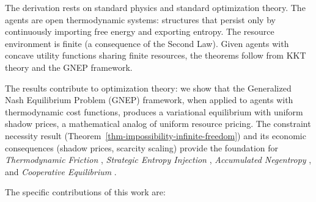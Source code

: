 \documentclass[11pt]{article}
\theoremstyle{plain}
\theoremstyle{definition}
\theoremstyle{remark}
\begin{document}
The derivation rests on standard physics and standard optimization
theory. The agents are open thermodynamic systems: structures that
persist only by continuously importing free energy and exporting
entropy. The resource environment is finite (a consequence of the Second
Law). Given agents with concave utility functions sharing finite
resources, the theorems follow from KKT theory and the GNEP framework.

The results contribute to optimization theory: we show that the
Generalized Nash Equilibrium Problem (GNEP) framework, when applied to
agents with thermodynamic cost functions, produces a variational
equilibrium with uniform shadow prices, a mathematical analog of uniform
resource pricing. The constraint necessity result
(Theorem~\ref{thm-impossibility-infinite-freedom}) and its economic
consequences (shadow prices, scarcity scaling) provide the foundation
for \emph{Thermodynamic Friction} \citep{TC-IV}, \emph{Strategic Entropy
Injection} \citep{TC-II}, \emph{Accumulated Negentropy} \citep{TC-III},
and \emph{Cooperative Equilibrium} \citep{TC-V}.

The specific contributions of this work are:
\end{document}
